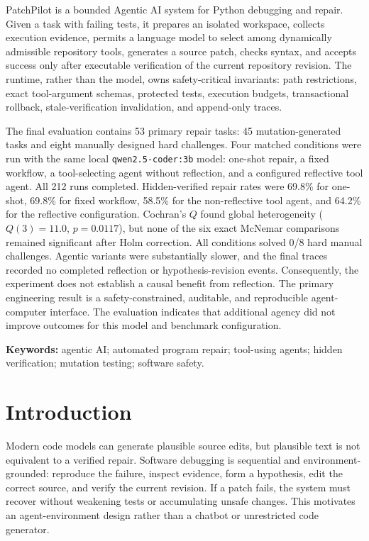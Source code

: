 \documentclass[11pt,a4paper]{article}
\newcommand{\code}[1]{\texttt{#1}}
\begin{document}
PatchPilot is a bounded Agentic AI system for Python debugging and repair.
Given a task with failing tests, it prepares an isolated workspace, collects
execution evidence, permits a language model to select among dynamically
admissible repository tools, generates a source patch, checks syntax, and accepts
success only after executable verification of the current repository revision.
The runtime, rather than the model, owns safety-critical invariants: path
restrictions, exact tool-argument schemas, protected tests, execution budgets,
transactional rollback, stale-verification invalidation, and append-only traces.

The final evaluation contains 53 primary repair tasks: 45 mutation-generated
tasks and eight manually designed hard challenges. Four matched conditions were
run with the same local \code{qwen2.5-coder:3b} model: one-shot repair, a fixed
workflow, a tool-selecting agent without reflection, and a configured reflective
tool agent. All 212 runs completed. Hidden-verified repair rates were 69.8\% for
one-shot, 69.8\% for fixed workflow, 58.5\% for the non-reflective tool agent,
and 64.2\% for the reflective configuration. Cochran's $Q$ found global
heterogeneity ($Q(3)=11.0$, $p=0.0117$), but none of the six exact McNemar
comparisons remained significant after Holm correction. All conditions solved
0/8 hard manual challenges. Agentic variants were substantially slower, and the
final traces recorded no completed reflection or hypothesis-revision events.
Consequently, the experiment does not establish a causal benefit from
reflection. The primary engineering result is a safety-constrained, auditable, and
reproducible agent-computer interface. The evaluation indicates that additional
agency did not improve outcomes for this model and benchmark configuration.

\vspace{0.6em}
\noindent\textbf{Keywords:} agentic AI; automated program repair; tool-using agents; hidden verification; mutation testing; software safety.

\clearpage
\section{Introduction}

Modern code models can generate plausible source edits, but plausible text is
not equivalent to a verified repair. Software debugging is sequential and
environment-grounded: reproduce the failure, inspect evidence, form a
hypothesis, edit the correct source, and verify the current revision. If a patch
fails, the system must recover without weakening tests or accumulating unsafe
changes. This motivates an agent-environment design rather than a chatbot or
unrestricted code generator.
\end{document}
